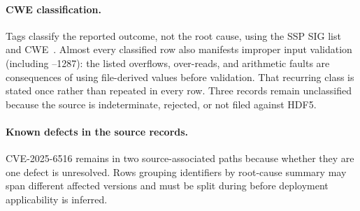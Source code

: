 \documentclass[../main.tex]{subfiles}
\begin{document}
\paragraph{CWE classification.}
Tags classify the reported outcome, not the root cause, using the SSP SIG list
and CWE~\cite{hdf5-top-cwe}. Almost every classified row also manifests
 improper input validation (including --1287):
the listed overflows, over-reads, and arithmetic faults are consequences of
using file-derived values before validation. That recurring class is stated
once rather than repeated in every row. Three records remain unclassified
because the source is indeterminate, rejected, or not filed against HDF5.

\paragraph{Known defects in the source records.}
CVE-2025-6516 remains in two source-associated paths because whether they are
one defect is unresolved. Rows grouping identifiers by root-cause summary may
span different affected versions and must be split during  before
deployment applicability is inferred.


\begingroup
\footnotesize
\setlength{\tabcolsep}{2pt}
\renewcommand{\arraystretch}{1.15}

\setlength{\LTleft}{-0.7in}
\setlength{\LTright}{-0.7in}
\end{document}
